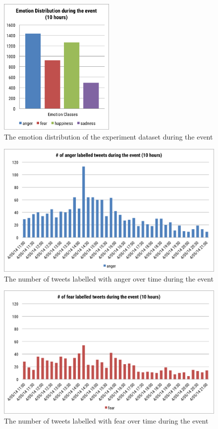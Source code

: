 \begin{figure}[htb!] 
\centering    
\includegraphics[width=0.5\textwidth]{EmotionDistributionEvent}
\caption{The emotion distribution of the experiment dataset during the event}
\label{fig:emotionDistributionEvent}
\end{figure}

\begin{figure}[htb!] 
\centering    
\includegraphics[width=1.0\textwidth]{AngerInstanceEvent}
\caption{The number of tweets labelled with anger over time during the event}
\label{fig:angerInstanceEvent}
\end{figure}

\begin{figure}[htb!] 
\centering    
\includegraphics[width=1.0\textwidth]{FearInstanceEvent}
\caption{The number of tweets labelled with fear over time during the event}
\label{fig:fearInstanceEvent}
\end{figure}

